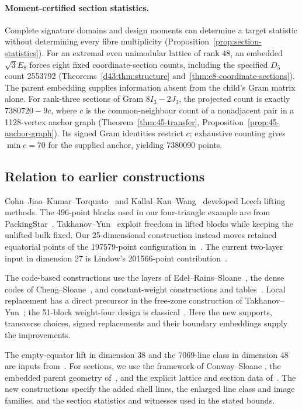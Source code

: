 \paragraph{Moment-certified section statistics.}
Complete signature domains and design moments can determine a target
statistic without determining every fibre multiplicity
(Proposition~\ref{prop:section-statistics}). For an extremal even
unimodular lattice of rank 48, an embedded $\sqrt3E_8$ forces eight
fixed coordinate-section counts, including the specified $D_5$ count
2553792 (Theorems~\ref{d43:thm:structure}
and~\ref{thm:e8-coordinate-sections}). The parent embedding supplies
information absent from the child's Gram matrix alone.
For rank-three sections of Gram $8I_3-2J_3$, the projected count is
exactly $7380720-9c$, where $c$ is the common-neighbour count of a
nonadjacent pair in a 1128-vertex anchor graph
(Theorem~\ref{thm:45-transfer}, Proposition~\ref{prop:45-anchor-graph}).
Its signed Gram identities restrict $c$; exhaustive counting gives
$\min c=70$ for the supplied anchor, yielding 7380090 points.

\subsection{Relation to earlier constructions}

Cohn--Jiao--Kumar--Torquato~\cite[Section 7]{cjkt} and
Kallal--Kan--Wang~\cite{kallal} developed Leech lifting methods.
The 496-point blocks used in our four-triangle example are from
PackingStar~\cite{packingstar,packingstar-data}.
Takhanov--Yun~\cite{takhanov-yun} exploit freedom in lifted blocks while
keeping the unlifted bulk fixed. Our 25-dimensional construction instead
moves retained equatorial points of the 197579-point configuration
in~\cite{kissingnumbers}. The current two-layer input in dimension 27
is Lindow's 201566-point contribution~\cite{lindow27}.

The code-based constructions use the layers of
Edel--Rains--Sloane~\cite{ers}, the dense codes of
Cheng--Sloane~\cite{chengsloane}, and constant-weight constructions
and tables~\cite{bsss,brouwer,echols}. Local replacement has a direct
precursor in the free-zone construction of
Takhanov--Yun~\cite[Section V]{signed-johnson}; the 51-block
weight-four design is classical~\cite{kalbfleisch-stanton}.
Here the new supports, transverse choices, signed replacements and
their boundary embeddings supply the improvements.

The empty-equator lift in dimension 38 and the 7069-line class in
dimension 48 are inputs from~\cite{kissingnumbers}.
For sections, we use the framework of Conway--Sloane
\cite{laminated,antipode}, the embedded parent geometry
of~\cite{dorofeev}, and the explicit lattice and section data
of~\cite{latticecatalogue,p48p-catalogue,crosssections}.
The new constructions specify the added shell lines, the enlarged
line class and image families, and the section statistics and witnesses
used in the stated bounds.

